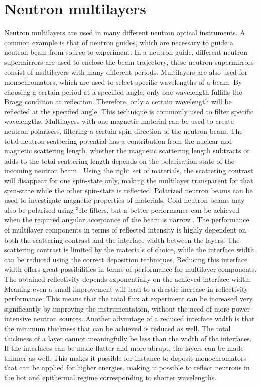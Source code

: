 \section{Neutron multilayers}
Neutron multilayers are used in many different neutron optical instruments. A common example is that of neutron guides, which are necessary to guide a neutron beam from source to experiment. In a neutron guide, different neutron supermirrors are used to enclose the beam trajectory, these neutron supermirrors consist of multilayers with many different periods. Multilayers are also used for monochromators, which are used to select specific wavelengths of a beam. By choosing a certain period at a specified angle, only one wavelength fulfills the Bragg condition at reflection. Therefore, only a certain wavelength will be reflected at the specified angle. This technique is commonly used to filter specific wavelengths. 
Multilayers with one magnetic material can be used to create neutron polarisers, filtering a certain spin direction of the neutron beam. The total neutron scattering potential has a contribution from the nuclear and magnetic scattering length, whether the magnetic scattering length subtracts or adds to the total scattering length depends on the polarisation state of the incoming neutron beam \cite{magneticscattering}. Using the right set of materials, the scattering contrast will disappear for one spin-state only, making the multilayer transparent for that spin-state while the other spin-state is reflected. Polarized neutron beams can be used to investigate magnetic properties of materials. Cold neutron beams may also be polarised using $^3$He filters, but a better performance can be achieved when the required angular acceptance of the beam is narrow \cite{depolarization_thierry}. 
The performance of multilayer components in terms of reflected intensity is highly dependent on both the scattering contrast and the interface width between the layers. The scattering contrast is limited by the materials of choice, while the interface width can be reduced using the correct deposition techniques. Reducing this interface width offers great possibilities in terms of performance for multilayer components. The obtained reflectivity depends exponentially on the achieved interface width. Meaning even a small improvement will lead to a drastic increase in reflectivity performance. This means that the total flux at experiment can be increased very significantly by improving the instrumentation, without the need of more power-intensive neutron sources. Another advantage of a reduced interface width is that the minimum thickness that can be achieved is reduced as well. The total thickness of a layer cannot meaningfully be less than the width of the interfaces. If the interfaces can be made flatter and more abrupt, the layers can be made thinner as well. This makes it possible for instance to deposit monochromators that can be applied for higher energies, making it possible to reflect neutrons in the hot and epithermal regime corresponding to shorter wavelengths.
